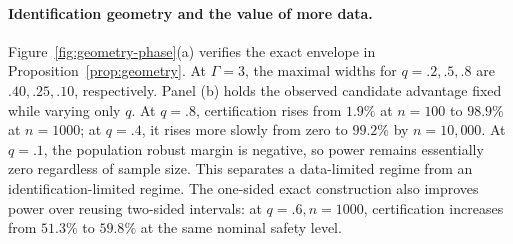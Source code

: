 \documentclass[letterpaper]{article}
\theoremstyle{remark}
\begin{document}
\paragraph{Identification geometry and the value of more data.}
Figure~\ref{fig:geometry-phase}(a) verifies the exact envelope in Proposition~\ref{prop:geometry}. At $\Gamma=3$, the maximal widths for $q=.2,.5,.8$ are $.40,.25,.10$, respectively. Panel (b) holds the observed candidate advantage fixed while varying only $q$. At $q=.8$, certification rises from $1.9\%$ at $n=100$ to $98.9\%$ at $n=1000$; at $q=.4$, it rises more slowly from zero to $99.2\%$ by $n=10{,}000$. At $q=.1$, the population robust margin is negative, so power remains essentially zero regardless of sample size. This separates a data-limited regime from an identification-limited regime. The one-sided exact construction also improves power over reusing two-sided intervals: at $q=.6,n=1000$, certification increases from $51.3\%$ to $59.8\%$ at the same nominal safety level.
\end{document}
